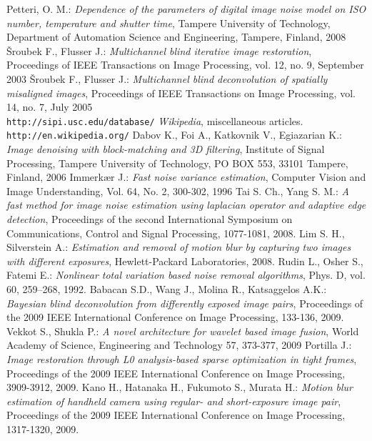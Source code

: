 \documentclass[12pt,notitlepage]{report}
\begin{document}
\begin{thebibliography}{xxxxx-99}
 Petteri, O. M.: {\em Dependence of the parameters of digital image noise model on ISO number, temperature and shutter time}, Tampere University of Technology, Department of Automation Science and Engineering, Tampere, Finland, 2008
 Šroubek F., Flusser J.: {\em Multichannel blind iterative image restoration}, Proceedings of IEEE Transactions on Image Processing, vol. 12, no. 9, September 2003
 Šroubek F., Flusser J.: {\em Multichannel blind deconvolution of spatially misaligned images},	Proceedings of IEEE Transactions on Image Processing, vol. 14, no. 7, July 2005
  \\ \texttt{http://sipi.usc.edu/database/}
  {\em Wikipedia}, miscellaneous articles. \\ \texttt{http://en.wikipedia.org/}
  Dabov K., Foi A., Katkovnik V., Egiazarian K.: {\em Image denoising with block-matching and 3D filtering}, Institute of Signal Processing, Tampere University of Technology, PO BOX 553, 33101 Tampere, Finland, 2006
  Immerkær J.: {\em Fast noise variance estimation}, Computer Vision and Image Understanding, Vol. 64, No. 2, 300-302, 1996
  Tai S. Ch., Yang S. M.: {\em A fast method for image noise estimation using laplacian operator and adaptive edge detection}, Proceedings of the second International Symposium on Communications, Control and Signal Processing, 1077-1081, 2008.
  Lim S. H., Silverstein A.: {\em Estimation and removal of motion blur by capturing two images with different exposures}, Hewlett-Packard Laboratories, 2008. 
  Rudin L., Osher S., Fatemi E.: {\em Nonlinear total variation based noise removal algorithms}, Phys. D, vol. 60, 259–268, 1992.
  Babacan S.D., Wang J., Molina R., Katsaggelos A.K.: {\em Bayesian blind deconvolution from differently exposed image pairs}, Proceedings of the 2009 IEEE International Conference on Image Processing, 133-136, 2009.
  Vekkot S.,  Shukla P.: {\em A novel architecture for wavelet based image fusion}, World Academy of Science, Engineering and Technology 57, 373-377, 2009
  Portilla J.: {\em Image restoration through L0 analysis-based sparse optimization in tight frames}, Proceedings of the 2009 IEEE International Conference on Image Processing, 3909-3912, 2009.
  Kano H., Hatanaka H., Fukumoto S., Murata H.: {\em Motion blur estimation of handheld camera using regular- and short-exposure image pair}, Proceedings of the 2009 IEEE International Conference on Image Processing, 1317-1320, 2009.
\end{thebibliography}
\end{document}
